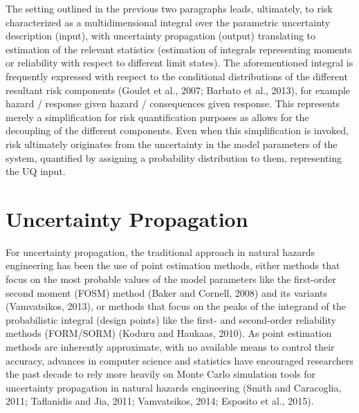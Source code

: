 The setting outlined in the previous two paragraphs leads, ultimately, to risk characterized as a multidimensional integral over the parametric uncertainty description (input), with uncertainty propagation (output) translating to estimation of the relevant statistics (estimation of integrals representing moments or reliability with respect to different limit states). The aforementioned integral is frequently expressed with respect to the conditional distributions of the different resultant risk components (Goulet et al., 2007; Barbato et al., 2013), for example {hazard / response given hazard / consequences given response}. This represents merely a simplification for risk quantification purposes as allows for the decoupling of the different components. Even when this simplification is invoked, risk ultimately originates from the uncertainty in the model parameters of the system, quantified by assigning a probability distribution to them, representing the UQ input. 

\section{Uncertainty Propagation}
\label{sec:uq_propagation}

For uncertainty propagation, the traditional approach in natural hazards engineering has been the use of point estimation methods, either methods that focus on the most probable values of the model parameters like the first-order second moment (FOSM) method (Baker and Cornell, 2008) and its variants (Vamvatsikos, 2013), or methods that focus on the peaks of the integrand of the probabilistic integral (design points) like the first- and second-order reliability methods (FORM/SORM) (Koduru and Haukaas, 2010). As point estimation methods are inherently approximate, with no available means to control their accuracy, advances in computer science and statistics have encouraged researchers the past decade to rely more heavily on Monte Carlo simulation tools for uncertainty propagation in natural hazards engineering (Smith and Caracoglia, 2011; Taflanidis and Jia, 2011; Vamvatsikos, 2014; Esposito et al., 2015). 

